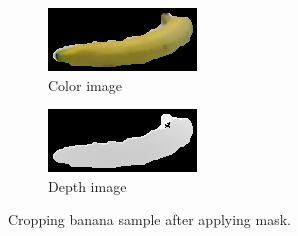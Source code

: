 \documentclass[paper=letter, fontsize=12pt]{article}
\begin{document}
\begin{figure}[htbp]
	\centering
	\begin{subfigure}[b]{0.32\linewidth}
		\includegraphics[width=\textwidth]{banana_1_1_1_crop}
		\caption{Color image}
	\end{subfigure}
	\begin{subfigure}[b]{0.32\linewidth}
		\includegraphics[width=\textwidth]{banana_1_1_1_depth_crop}
		\caption{Depth image}
	\end{subfigure}
	\caption{Cropping banana sample after applying mask.}
	\label{fig:banana_crop}
\end{figure}
\end{document}
